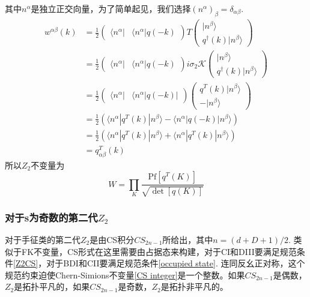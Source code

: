 \documentclass{article}
\numberwithin{equation}{subsection}
\begin{document}
其中$n^\alpha$是独立正交向量，为了简单起见，我们选择$(n^\alpha)_\beta=\delta_{\alpha\beta}$.
\begin{equation}
    \begin{split}
        w^{\alpha\beta}(k)&=\frac{1}{2}\begin{pmatrix}
            \langle n^\alpha|&\langle n^\alpha| q(-k)
        \end{pmatrix}T\begin{pmatrix}
            |n^\beta\rangle\\
            q^\dagger(k)|n^\beta\rangle
        \end{pmatrix}\\
        &=\frac{1}{2}\begin{pmatrix}
            \langle n^\alpha|&\langle n^\alpha| q(-k)
        \end{pmatrix}i\sigma_2\mathcal{K}\begin{pmatrix}
            |n^\beta\rangle\\
            q^\dagger(k)|n^\beta\rangle
        \end{pmatrix}\\
        &=\frac{1}{2}\begin{pmatrix}
            \langle n^\alpha|&\langle n^\alpha|q(-k)|
        \end{pmatrix}\begin{pmatrix}
            q^T(k)|n^\beta\rangle\\
            -|n^\beta\rangle
        \end{pmatrix}\\
        &=\frac{1}{2}(\langle n^\alpha|q^T(k)|n^\beta\rangle-\langle n^\alpha|q(-k)|n^\beta\rangle)\\
        &=\frac{1}{2}(\langle n^\alpha|q^T(k)|n^\beta\rangle+\langle n^\alpha|q^T(k)|n^\beta\rangle)\\
        &=q^T_{\alpha\beta}(k)
    \end{split}
\end{equation}
所以$Z_2$不变量为
\begin{equation}
    W=\prod_{K}\frac{\mathrm{Pf}[q^T(K)]}{\sqrt{\det [q(K)]}}
\end{equation}
\subsubsection{对于s为奇数的第二代$Z_2$}
对于手征类的第二代$Z_2$是由CS积分$CS_{2n-1}$所给出，其中$n=(d+D+1)/2$. 类似于FK不变量，CS形式在这里需要由占据态来构建，对于CI和DIII要满足规范条件\eqref{Z2CS}，对于BDI和CII要满足规范条件\eqref{occupied state}. 连同反幺正对称，这个规范约束迫使Chern-Simions不变量\eqref{CS integer}是一个整数。如果$CS_{2n-1}$是偶数，$Z_2$是拓扑平凡的，如果$CS_{2n-1}$是奇数，$Z_2$是拓扑非平凡的。
\end{document}
